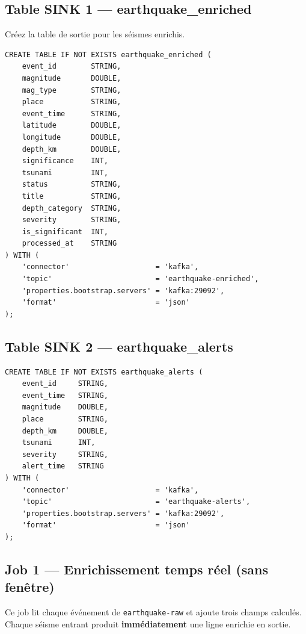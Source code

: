 \documentclass[12pt,a4paper]{article}
\begin{document}
\subsection{Table SINK 1 --- earthquake\_enriched}

Créez la table de sortie pour les séismes enrichis.

\begin{lstlisting}[style=sql, caption={Table sink --- earthquake\_enriched}]
CREATE TABLE IF NOT EXISTS earthquake_enriched (
    event_id        STRING,
    magnitude       DOUBLE,
    mag_type        STRING,
    place           STRING,
    event_time      STRING,
    latitude        DOUBLE,
    longitude       DOUBLE,
    depth_km        DOUBLE,
    significance    INT,
    tsunami         INT,
    status          STRING,
    title           STRING,
    depth_category  STRING,
    severity        STRING,
    is_significant  INT,
    processed_at    STRING
) WITH (
    'connector'                    = 'kafka',
    'topic'                        = 'earthquake-enriched',
    'properties.bootstrap.servers' = 'kafka:29092',
    'format'                       = 'json'
);
\end{lstlisting}

\subsection{Table SINK 2 --- earthquake\_alerts}

\begin{lstlisting}[style=sql, caption={Table sink --- earthquake\_alerts}]
CREATE TABLE IF NOT EXISTS earthquake_alerts (
    event_id     STRING,
    event_time   STRING,
    magnitude    DOUBLE,
    place        STRING,
    depth_km     DOUBLE,
    tsunami      INT,
    severity     STRING,
    alert_time   STRING
) WITH (
    'connector'                    = 'kafka',
    'topic'                        = 'earthquake-alerts',
    'properties.bootstrap.servers' = 'kafka:29092',
    'format'                       = 'json'
);
\end{lstlisting}

\subsection{Job 1 --- Enrichissement temps réel (sans fenêtre)}

Ce job lit chaque événement de \texttt{earthquake-raw} et ajoute trois champs calculés.
Chaque séisme entrant produit \textbf{immédiatement} une ligne enrichie en sortie.
\end{document}
